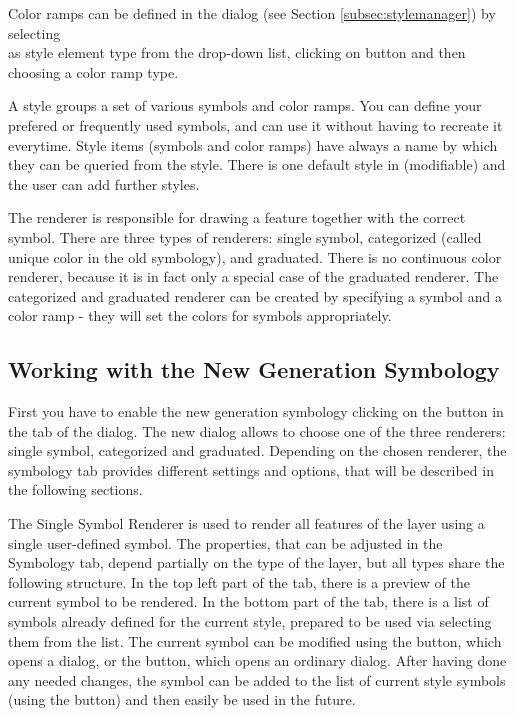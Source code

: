 Color ramps can be defined in the  dialog (see Section
\ref{subsec:stylemanager}) by selecting \\
 as style element type from the drop-down list, clicking on  button and then choosing a color ramp type.


A style groups a set of various symbols and color ramps. You can define your
prefered or frequently used symbols, and can use it  without having to recreate
it everytime. Style items (symbols and color ramps) have always a name by which
they can be queried from the style. There is one default style in \qg (modifiable)
and the user can add further styles.


The renderer is responsible for drawing a feature together with the correct
symbol. There are three types of renderers: single symbol, categorized (called
unique color in the old symbology), and graduated. There is no continuous color
renderer, because it is in fact only a special case of the graduated renderer.
The categorized and graduated renderer can be created by specifying a symbol
and a color ramp - they will set the colors for symbols appropriately.

\subsection{Working with the New Generation Symbology}

First you have to enable the new generation symbology clicking on the
 button in the  tab of the
 dialog. The new dialog allows to choose one of the
three renderers: single symbol, categorized and graduated. Depending on the
chosen renderer, the symbology tab provides different settings and options, that
will be described in the following sections.


The Single Symbol Renderer is used to render all features of the layer using a
single user-defined symbol. The properties, that can be adjusted in the
Symbology tab, depend partially on the type of the layer, but all types share
the following structure. In the top left part of the tab, there is a preview of
the current symbol to be rendered. In the bottom part of the tab, there is a
list of symbols already defined for the current style, prepared to be used via
selecting them from the list. The current symbol can be modified using the
 button, which opens a  dialog, or
the  button, which opens an ordinary  dialog.
After having done any needed changes, the symbol can be added to the list of
current style symbols (using the  button) and then easily
be used in the future.

